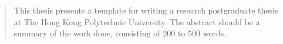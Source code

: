 \begin{abstract}

This thesis presents a template for writing a research postgraduate thesis
at The Hong Kong Polytechnic University. The abstract should be a summary
of the work done, consisting of 200 to 500 words.

\end{abstract}
